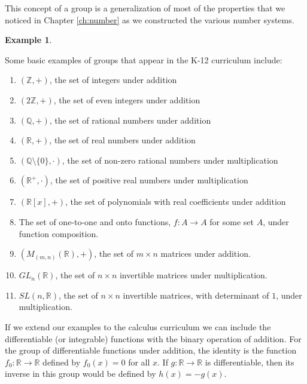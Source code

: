 \documentclass[
]{book}
\theoremstyle{definition}
\theoremstyle{definition}
\newtheorem{example}{Example}[chapter]
\theoremstyle{definition}
\theoremstyle{definition}
\theoremstyle{remark}
\begin{document}
This concept of a group is a generalization of most of the properties that we noticed in Chapter \ref{ch:number} as we constructed the various number systems.

\begin{example}
\protect\hypertarget{exm:group-list}{}\label{exm:group-list}

Some basic examples of groups that appear in the K-12 curriculum include:

\begin{enumerate}
\def\labelenumi{\arabic{enumi}.}
\item
  \((\mathbb{Z},+)\), the set of integers under addition
\item
  \((2\mathbb{Z},+)\), the set of even integers under addition
\item
  \((\mathbb{Q},+)\), the set of rational numbers under addition
\item
  \((\mathbb{R},+)\), the set of real numbers under addition
\item
  \((\mathbb{Q}\setminus\{0\} , \cdot)\), the set of non-zero rational numbers under multiplication
\item
  \(( \mathbb{R}^+, \cdot)\), the set of positive real numbers under multiplication
\item
  \(\left( \mathbb{R}[x], +\right)\), the set of polynomials with real coefficients under addition
\item
  The set of one-to-one and onto functions, \(f:A\rightarrow A\) for some set \(A\), under function composition.
\item
  \(\left( M_{(m,n)}(\mathbb{R}), + \right)\), the set of \(m \times n\) matrices under addition.
\item
  \(GL_n(\mathbb{R})\), the set of \(n \times n\) invertible matrices under multiplication.
\item
  \(SL(n,\mathbb{R})\), the set of \(n \times n\) invertible matrices, with determinant of \(1\), under multiplication.\\
\end{enumerate}

\end{example}

If we extend our examples to the calculus curriculum we can include the differentiable (or integrable) functions with the binary operation of addition. For the group of differentiable functions under addition, the identity is the function \(f_0:\mathbb{R}\rightarrow \mathbb{R}\) defined by \(f_0(x)=0\) for all \(x\). If \(g:\mathbb{R}\rightarrow \mathbb{R}\) is differentiable, then its inverse in this group would be defined by \(h(x)=-g(x)\).
\end{document}
